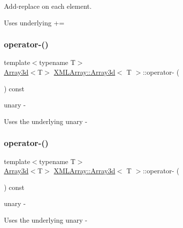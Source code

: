 Add-\/replace on each element. 

Uses underlying += \mbox{\label{classXMLArray_1_1Array3d_ae6a356b75bd22316f0d4f94beea360d9}} 
\subsubsection{\texorpdfstring{operator-\/()}{operator-()}\hspace{0.1cm}{\footnotesize\ttfamily [1/3]}}
{\footnotesize\ttfamily template$<$typename T$>$ \\
\mbox{\hyperlink{classXMLArray_1_1Array3d}{Array3d}}$<$T$>$ \mbox{\hyperlink{classXMLArray_1_1Array3d}{X\+M\+L\+Array\+::\+Array3d}}$<$ T $>$\+::operator-\/ (\begin{DoxyParamCaption}{ }\end{DoxyParamCaption}) const\hspace{0.3cm}{\ttfamily [inline]}}



unary -\/ 

Uses the underlying unary -\/ \mbox{\label{classXMLArray_1_1Array3d_ae6a356b75bd22316f0d4f94beea360d9}} 
\subsubsection{\texorpdfstring{operator-\/()}{operator-()}\hspace{0.1cm}{\footnotesize\ttfamily [2/3]}}
{\footnotesize\ttfamily template$<$typename T$>$ \\
\mbox{\hyperlink{classXMLArray_1_1Array3d}{Array3d}}$<$T$>$ \mbox{\hyperlink{classXMLArray_1_1Array3d}{X\+M\+L\+Array\+::\+Array3d}}$<$ T $>$\+::operator-\/ (\begin{DoxyParamCaption}{ }\end{DoxyParamCaption}) const\hspace{0.3cm}{\ttfamily [inline]}}



unary -\/ 

Uses the underlying unary -\/ \mbox{\label{classXMLArray_1_1Array3d_ae6a356b75bd22316f0d4f94beea360d9}} 
